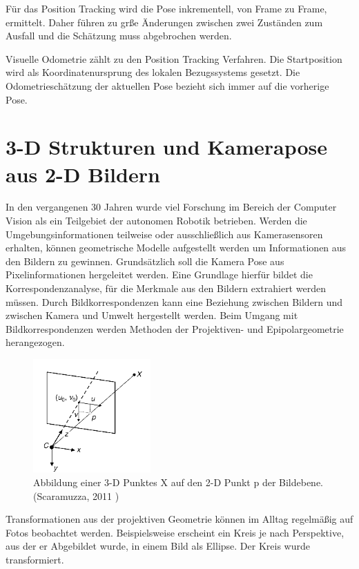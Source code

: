 Für das Position Tracking wird die Pose inkrementell, von Frame zu Frame, ermittelt. Daher führen zu gr{\ss}e Änderungen zwischen zwei Zuständen zum Ausfall und die Schätzung muss abgebrochen werden.
\newline

Visuelle Odometrie zählt zu den Position Tracking Verfahren. Die Startposition wird als Koordinatenursprung des lokalen Bezugssystems gesetzt. Die Odometrieschätzung der aktuellen Pose bezieht sich immer auf die vorherige Pose. 

\section{3-D Strukturen und Kamerapose aus 2-D Bildern}
In den vergangenen 30 Jahren wurde viel Forschung im Bereich der Computer Vision als ein Teilgebiet der autonomen Robotik betrieben. Werden die Umgebungsinformationen teilweise oder ausschlie{\ss}lich aus Kamerasensoren erhalten, können geometrische Modelle aufgestellt werden um Informationen aus den Bildern zu gewinnen. Grundsätzlich soll die Kamera Pose aus Pixelinformationen hergeleitet werden. Eine Grundlage hierfür bildet die Korrespondenzanalyse, für die Merkmale aus den Bildern extrahiert werden müssen. Durch Bildkorrespondenzen kann eine Beziehung zwischen Bildern und zwischen Kamera und Umwelt hergestellt werden. Beim Umgang mit Bildkorrespondenzen werden Methoden der Projektiven- und Epipolargeometrie herangezogen.
\begin{figure}[!ht]
  \centering
  \includegraphics[width=0.4\textwidth]{pictures/02_2dpane.png}
  \caption[Abbildung von 3-D zu 2-D]{Abbildung einer 3-D Punktes X auf den 2-D Punkt p der Bildebene. (Scaramuzza, 2011 \cite{ScFrVO})}
  \label{fig:2dpane}
\end{figure}

Transformationen aus der projektiven Geometrie können im Alltag regelmä{\ss}ig auf Fotos beobachtet werden.  Beispielsweise erscheint ein Kreis je nach Perspektive, aus der er Abgebildet wurde, in einem Bild als Ellipse. Der Kreis wurde transformiert.
\newline

